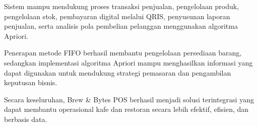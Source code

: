 Sistem mampu mendukung proses transaksi penjualan, pengelolaan produk, pengelolaan stok, pembayaran digital melalui QRIS, penyusunan laporan penjualan, serta analisis pola pembelian pelanggan menggunakan algoritma Apriori.

Penerapan metode FIFO berhasil membantu pengelolaan persediaan barang, sedangkan implementasi algoritma Apriori mampu menghasilkan informasi yang dapat digunakan untuk mendukung strategi pemasaran dan pengambilan keputusan bisnis.

Secara keseluruhan, Brew \& Bytes POS berhasil menjadi solusi terintegrasi yang dapat membantu operasional kafe dan restoran secara lebih efektif, efisien, dan berbasis data.

